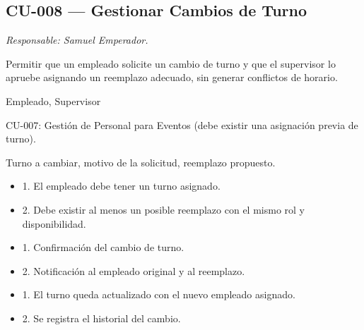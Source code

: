 \subsection{CU-008 --- Gestionar Cambios de Turno}
\label{cu:cu-008}
\textit{Responsable: Samuel Emperador.}

\begin{description}[leftmargin=!, labelwidth=3.4cm, style=nextline, topsep=3pt]
\item[Objetivo] Permitir que un empleado solicite un cambio de turno y que el supervisor lo apruebe asignando un reemplazo adecuado, sin generar conflictos de horario.

\item[Actores] Empleado, Supervisor

\item[CU relacionados] CU-007: Gestión de Personal para Eventos (debe existir una asignación previa de turno).

\item[Entradas] Turno a cambiar, motivo de la solicitud, reemplazo propuesto.

\item[Pre-condiciones] \hfill
\begin{itemize}[leftmargin=1.2em, topsep=1pt]
  \item 1. El empleado debe tener un turno asignado.
  \item 2. Debe existir al menos un posible reemplazo con el mismo rol y disponibilidad.
\end{itemize}

\item[Salidas] \hfill
\begin{itemize}[leftmargin=1.2em, topsep=1pt]
  \item 1. Confirmación del cambio de turno.
  \item 2. Notificación al empleado original y al reemplazo.
\end{itemize}

\item[Post-condiciones] \hfill
\begin{itemize}[leftmargin=1.2em, topsep=1pt]
  \item 1. El turno queda actualizado con el nuevo empleado asignado.
  \item 2. Se registra el historial del cambio.
\end{itemize}

\end{description}

